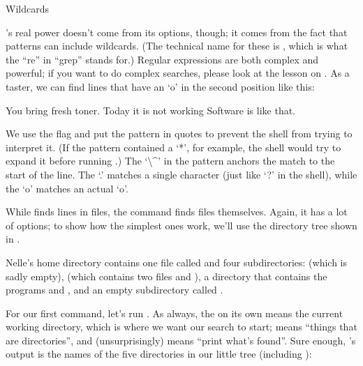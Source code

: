 \begin{swcbox}{Wildcards}

's real power doesn't come from its options, though; it
comes from the fact that patterns can include wildcards. (The technical
name for these is ,
which is what the ``re'' in ``grep'' stands for.) Regular expressions
are both complex and powerful; if you want to do complex searches,
please look at the lesson on . As a taster, we can find lines that have an `o' in the second
position like this:


\begin{VerbOut}
You bring fresh toner.
Today it is not working
Software is like that.
\end{VerbOut}

We use the  flag and put the pattern in quotes to prevent the
shell from trying to interpret it. (If the pattern contained a `*', for
example, the shell would try to expand it before running .)
The `\textbackslash{}\^{}' in the pattern anchors the match to the start
of the line. The `.' matches a single character (just like `?' in the
shell), while the `o' matches an actual `o'.

\end{swcbox}

While  finds lines in files, the  command
finds files themselves. Again, it has a lot of options; to show how the
simplest ones work, we'll use the directory tree shown in .


Nelle's home directory contains one file called  and
four subdirectories:  (which is sadly empty),
 (which contains two files  and
), a  directory that contains the programs
 and , and an empty subdirectory called
.

For our first command, let's run . As
always, the  on its own means the current working directory,
which is where we want our search to start;  means
``things that are directories'', and (unsurprisingly) 
means ``print what's found''. Sure enough, 's output is the
names of the five directories in our little tree (including ):

